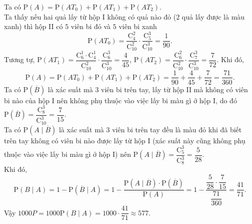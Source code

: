 \begin{ex}
{		Ta có $\mathrm{P}(A)=\mathrm{P}(AT_{0})+\mathrm{P}(AT_{1})+\mathrm{P}(AT_{2})$.\\
		Ta thấy nếu hai quả lấy từ hộp I không có quả nào đỏ ($2$ quả lấy được là màu xanh) thì hộp II có $5$ viên bi đỏ và $5$ viên bi xanh \[\mathrm{P}(AT_{0})=\dfrac{\mathrm{C}_{4}^{2}}{\mathrm{C}_{10}^{2}}\cdot \dfrac{\mathrm{C}_{5}^{3}}{\mathrm{C}_{10}^{3}}=\dfrac{1}{90}.\]
		Tương tự, $\mathrm{P}\left(AT_{1}\right)=\dfrac{\mathrm{C}_{6}^{1}\cdot\mathrm{C}_{4}^{1}}{\mathrm{C}_{10}^{2}}\cdot \dfrac{\mathrm{C}_{6}^{3}}{\mathrm{C}_{10}^{3}}=\dfrac{4}{45}$, $\mathrm{P}\left(AT_{2}\right)=\dfrac{\mathrm{C}_{6}^{2}}{\mathrm{C}_{10}^{2}}\cdot \dfrac{\mathrm{C}_{7}^{3}}{\mathrm{C}_{10}^{3}}=\dfrac{7}{72}$. Khi đó, \[\mathrm{P}\left(A\right)=\mathrm{P}\left(AT_{0}\right)+\mathrm{P}\left(AT_{1}\right)+\mathrm{P}\left(AT_{2}\right)=\dfrac{1}{90}+\dfrac{4}{45}+\dfrac{7}{72}=\dfrac{71}{360}.\]
		Ta có $\mathrm{P}\left(\overline{B}\right)$ là xác suất mà $3$ viên bi trên tay, lấy từ hộp II mà không có viên bi nào của hộp I nên không phụ thuộc vào việc lấy bi màu gì ở hộp I, do đó $\mathrm{P}\left(\overline{B}\right)=\dfrac{\mathrm{C}_{8}^{3}}{\mathrm{C}_{10}^{3}}=\dfrac{7}{15}$.\\
		Ta có $\mathrm{P}\left(A\mid \overline{B}\right)$ là xác suất mà $3$ viên bi trên tay đều là màu đỏ khi đã biết trên tay không có viên bi nào được lấy từ hộp I (xác suất này cũng không phụ thuộc vào việc lấy bi màu gì ở hộp I) nên $\mathrm{P}\left(A\mid \overline{B}\right)=\dfrac{\mathrm{C}_{5}^{3}}{\mathrm{C}_{8}^{3}}=\dfrac{5}{28}$.\\
		Khi đó, \[\mathrm{P}\left(B\mid A\right)=1-\mathrm{P}\left(\overline{B}\mid A\right) =1-\dfrac{\mathrm{P}\left(A\mid \overline{B}\right)\cdot\mathrm{P}\left(\overline{B}\right)}{\mathrm{P}\left(A\right)}=1-\dfrac{\dfrac{5}{28}\cdot \dfrac{7}{15}}{\dfrac{71}{360}}=\dfrac{41}{71}.\]
		Vậy $1000P=1000\mathrm{P}\left(B\mid A\right)=1000\cdot\dfrac{41}{71}\approx 577$.
	}
\end{ex}
\newpage
{}
\label{B\thedeso}